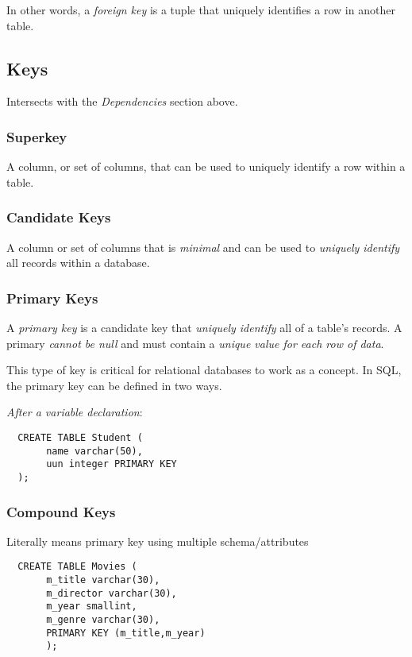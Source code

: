 \documentclass{article}
\begin{document}
In other words, a \textit{foreign key} is a tuple that uniquely identifies a row in another table.

\subsection{Keys}

Intersects with the \textit{Dependencies} section above.

\subsubsection*{Superkey}

A column, or set of columns, that can be used to uniquely identify a row within a table.

\subsubsection*{Candidate Keys}

A column or set of columns that is \textit{minimal} and can be used to \textit{uniquely identify} all records within a database.

\subsubsection*{Primary Keys}

A \textit{primary key} is a candidate key that \textit{uniquely identify} all of a table's records. A primary \textit{cannot be null} and must contain a \textit{unique value for each row of data}.

This type of key is critical for relational databases to work as a concept. In SQL, the primary key can be defined in two ways.

\textit{After a variable declaration}:

\begin{lstlisting}
  CREATE TABLE Student (
       name varchar(50),
       uun integer PRIMARY KEY
  );
\end{lstlisting}

\subsubsection*{Compound Keys}
Literally means primary key using multiple schema/attributes

\begin{lstlisting}
  CREATE TABLE Movies (
       m_title varchar(30),
       m_director varchar(30),
       m_year smallint,
       m_genre varchar(30),
       PRIMARY KEY (m_title,m_year)
       );
\end{lstlisting}
\end{document}
